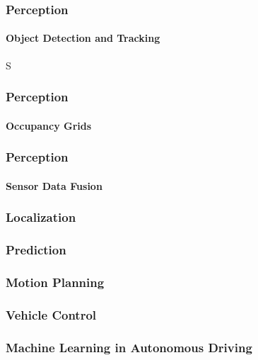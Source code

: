 \begin{frame}
\frametitle{Perception}
\framesubtitle{Object Detection and Tracking}

\end{frame}

\begin{frame}S
\frametitle{Perception}
\framesubtitle{Occupancy Grids}

\end{frame}

\begin{frame}
\frametitle{Perception}
\framesubtitle{Sensor Data Fusion}

\end{frame}

\begin{frame}
\frametitle{Localization}

\end{frame}

\begin{frame}
\frametitle{Prediction}

\end{frame}

\begin{frame}
\frametitle{Motion Planning}

\end{frame}

\begin{frame}
\frametitle{Vehicle Control}

\end{frame}

\begin{frame}
\frametitle{Machine Learning in Autonomous Driving}

\end{frame}